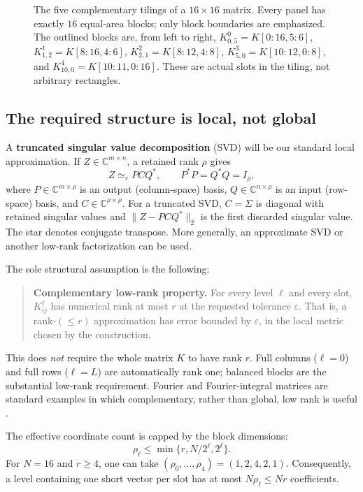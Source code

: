 \documentclass[11pt]{article}
\newcommand{\C}{\mathbb{C}}
\newcommand{\e}{\varepsilon}
\newcommand{\simeqeps}{\simeq_{\e}}
\begin{document}
\begin{figure}[htbp]
\caption{The five complementary tilings of a $16\times16$ matrix.  Every panel has exactly $16$ equal-area blocks; only block boundaries are emphasized.  The outlined blocks are, from left to right, $K_{0,5}^0=K[0:16,5:6]$, $K_{1,2}^1=K[8:16,4:6]$, $K_{2,1}^2=K[8:12,4:8]$, $K_{5,0}^3=K[10:12,0:8]$, and $K_{10,0}^4=K[10:11,0:16]$.  These are actual slots in the tiling, not arbitrary rectangles.}
\label{fig:tilings}
\end{figure}

\subsection{The required structure is local, not global}

A \textbf{truncated singular value decomposition} (SVD) will be our standard local approximation.  If $Z\in\C^{m\times n}$, a retained rank $\rho$ gives
\[
 Z\simeqeps P C Q^*,\qquad P^*P=Q^*Q=I_\rho,
\]
where $P\in\C^{m\times\rho}$ is an output (column-space) basis, $Q\in\C^{n\times\rho}$ is an input (row-space) basis, and $C\in\C^{\rho\times\rho}$.  For a truncated SVD, $C=\Sigma$ is diagonal with retained singular values and $\|Z-PCQ^*\|_2$ is the first discarded singular value.  The star denotes conjugate transpose.  More generally, an approximate SVD or another low-rank factorization can be used.

The sole structural assumption is the following:
\begin{quote}
\textbf{Complementary low-rank property.}  For every level $\ell$ and every slot, $K_{ij}^{\ell}$ has numerical rank at most $r$ at the requested tolerance $\e$.  That is, a rank-$(\le r)$ approximation has error bounded by $\e$, in the local metric chosen by the construction.
\end{quote}
This does \emph{not} require the whole matrix $K$ to have rank $r$.  Full columns ($\ell=0$) and full rows ($\ell=L$) are automatically rank one; balanced blocks are the substantial low-rank requirement.  Fourier and Fourier-integral matrices are standard examples in which complementary, rather than global, low rank is useful \cite{BF,IDBF}.

The effective coordinate count is capped by the block dimensions:
\[
 \rho_\ell\le\min\{r,N/2^\ell,2^\ell\}.
 \tag{2}\label{eq:rho}
\]
For $N=16$ and $r\ge4$, one can take $(\rho_0,\dots,\rho_4)=(1,2,4,2,1)$.  Consequently, a level containing one short vector per slot has at most $N\rho_\ell\le Nr$ coefficients.
\end{document}
